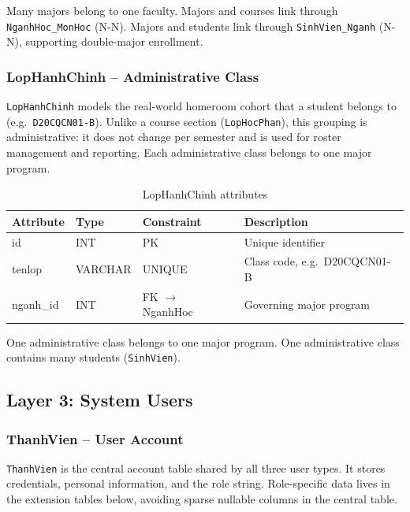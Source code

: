 \documentclass[12pt,a4paper]{report}
\begin{document}
Many majors belong to one faculty. Majors and courses link through \texttt{NganhHoc\_MonHoc} (N-N). Majors and students link through \texttt{SinhVien\_Nganh} (N-N), supporting double-major enrollment.

\subsubsection{LopHanhChinh -- Administrative Class}

\texttt{LopHanhChinh} models the real-world homeroom cohort that a student belongs to (e.g.\ \texttt{D20CQCN01-B}). Unlike a course section (\texttt{LopHocPhan}), this grouping is administrative: it does not change per semester and is used for roster management and reporting. Each administrative class belongs to one major program.

\begin{table}[H]
\renewcommand{\arraystretch}{1.35}
\caption{LopHanhChinh attributes}
\label{tab:lophanhchinh}
\begin{tabular}{|p{3cm}|p{2.5cm}|p{2.5cm}|p{5.5cm}|}
  \hline
  \textbf{Attribute} & \textbf{Type} & \textbf{Constraint} & \textbf{Description} \\
  \hline
  id & INT & PK & Unique identifier \\
  \hline
  tenlop & VARCHAR & UNIQUE & Class code, e.g.\ D20CQCN01-B \\
  \hline
  nganh\_id & INT & FK $\to$ NganhHoc & Governing major program \\
  \hline
\end{tabular}
\end{table}

One administrative class belongs to one major program. One administrative class contains many students (\texttt{SinhVien}).

\subsection{Layer 3: System Users}

\subsubsection{ThanhVien -- User Account}

\texttt{ThanhVien} is the central account table shared by all three user types. It stores credentials, personal information, and the role string. Role-specific data lives in the extension tables below, avoiding sparse nullable columns in the central table.
\end{document}
